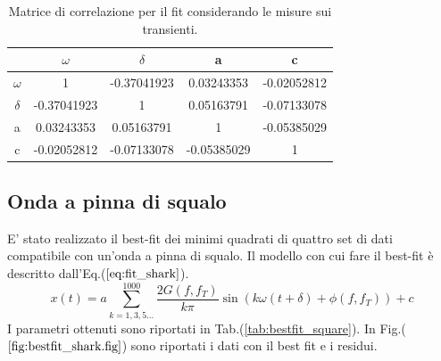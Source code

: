 \documentclass{article}
\begin{document}
            \begin{table}
                \centering
                \begin{tabular}{ccccc}
                    \hline
                    & $\omega$ & $\delta$ & a & c \\
                    \hline
                    $\omega$ & 1 & -0.37041923 & 0.03243353 & -0.02052812 \\
                    $\delta$ & -0.37041923 & 1 & 0.05163791 & -0.07133078 \\
                    a & 0.03243353 & 0.05163791 & 1 & -0.05385029 \\
                    c & -0.02052812 & -0.07133078 & -0.05385029 & 1 \\
                    \hline
                \end{tabular}
                \caption{Matrice di correlazione per il fit considerando le misure sui transienti.}
                \label{tab:corr_matrix_with_transients}
            \end{table}
            
    \subsection{Onda a pinna di squalo}
        E' stato realizzato il best-fit dei minimi quadrati
        di quattro set di dati compatibile con un'onda a pinna di squalo.
        Il modello con cui fare il best-fit è descritto dall'Eq.($\ref{eq:fit_shark}$).
                \begin{equation}
                    x(t) = a\sum_{k=1,3,5...}^{1000} \frac{2G(f,f_T)}{k\pi}\sin\left(k\omega (t+\delta)+\phi(f,f_T)\right) +c
                    \label{eq:fit_shark}
                \end{equation} 
        I parametri ottenuti sono riportati in Tab.(\ref{tab:bestfit_square}).%
        In Fig.($\ref{fig:bestfit_shark.fig}$) sono riportati i dati con il best fit e 
        i residui.
\end{document}
